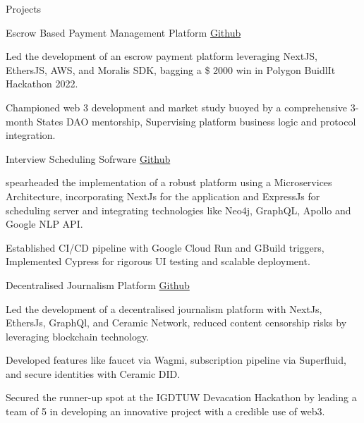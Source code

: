 \documentclass[10pt]{resume}
\begin{document}
    \begin{rSection}{Projects}
            \begin{rSubsection}{Escrow Based Payment Management Platform}            {\href{https://github.com/RevereLabs}{Github}}
                \item Led the development of an escrow payment platform \vspace{-0.3em} leveraging NextJS, EthersJS, AWS, and Moralis SDK, bagging a \$ 2000 win in Polygon BuidlIt Hackathon 2022. 
                \item Championed web 3 development and market study buoyed \vspace{-0.3em} by a comprehensive 3-month States DAO mentorship, Supervising platform business logic and protocol integration.
    	\end{rSubsection}
        
        \begin{rSubsection}{Interview Scheduling Sofrware}
            {\href{https://github.com/VisShon/InterviewLink}{Github}}
                \item spearheaded the implementation of a robust platform \vspace{-0.3em}using a Microservices Architecture, incorporating NextJs for the application and ExpressJs for scheduling server and integrating technologies like Neo4j, GraphQL, Apollo and Google NLP API.
                \item Established CI/CD pipeline with Google Cloud Run and GBuild triggers, Implemented Cypress for rigorous UI testing and scalable deployment.
    	\end{rSubsection}

         
         \begin{rSubsection}{Decentralised Journalism Platform}
            {\href{https://github.com/0xFethr}{Github}}
                \item Led the development of a decentralised journalism \vspace{-0.3em}platform with NextJs, EthersJs, GraphQl, and Ceramic Network, reduced content censorship risks by leveraging blockchain technology. 
                \item Developed features like faucet via Wagmi, subscription pipeline via Superfluid, and secure identities with Ceramic DID. 
                \item Secured the runner-up spot at the IGDTUW Devacation \vspace{-0.3em} Hackathon by leading a team of 5 in developing an innovative project with a credible use of web3.
        \end{rSubsection}


\end{rSection}
\end{document}
